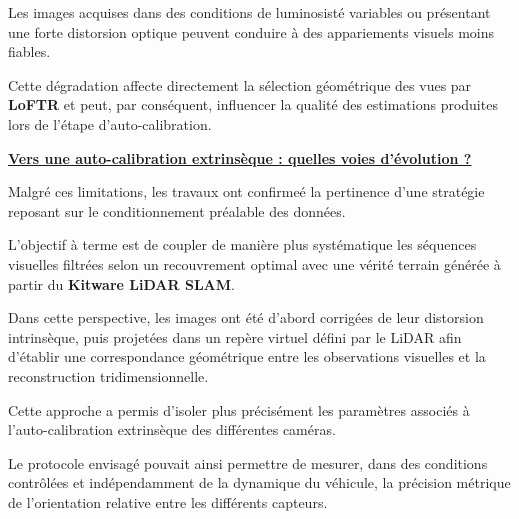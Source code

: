 \documentclass[12pt,a4paper,oneside]{report}
\begin{document}
\begin{enumerate}[itemsep=0.5em]
    \hspace*{1cm}Les images acquises dans des conditions de luminosisté variables ou présentant une forte distorsion optique peuvent conduire à des appariements visuels moins fiables.\vspace{0.05cm}

    \hspace*{0.5cm}Cette dégradation affecte directement la sélection géométrique des vues par \textbf{LoFTR} et peut, par conséquent, influencer la qualité des estimations produites lors de l'étape d'auto-calibration.

\end{enumerate}

\vspace{1cm}

\noindent\textbf{\uline{\large Vers une auto-calibration extrinsèque : quelles voies d'évolution ?}}\par
\medskip

\vspace{0.5cm}

\hspace*{1cm}Malgré ces limitations, les travaux ont confirmeé la pertinence d'une stratégie reposant sur le conditionnement préalable des données. \vspace{0.1cm}

\hspace*{0.5cm}L'objectif à terme est de coupler de manière plus systématique les séquences visuelles filtrées selon un recouvrement optimal avec une vérité terrain générée à partir du \textbf{Kitware LiDAR SLAM}.\vspace{0.1cm}

\hspace*{1cm}Dans cette perspective, les images ont été d'abord corrigées de leur distorsion intrinsèque, puis projetées dans un repère virtuel défini par le LiDAR afin d'établir une correspondance géométrique entre les observations visuelles et la reconstruction tridimensionnelle.\vspace{0.5cm}

\hspace*{1cm}Cette approche a permis d'isoler plus précisément les paramètres associés à l'auto-calibration extrinsèque des différentes caméras. \vspace{0.05cm}

\hspace*{0.5cm}Le protocole envisagé pouvait ainsi permettre de mesurer, dans des conditions contrôlées et indépendamment de la dynamique du véhicule, la précision métrique de l'orientation relative entre les différents capteurs.\vspace{0.1cm}
\end{document}
